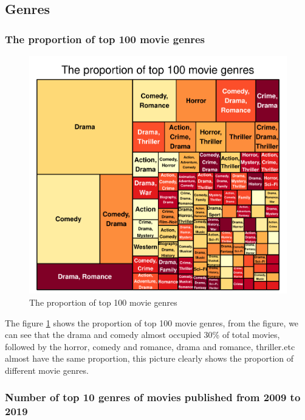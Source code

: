 \documentclass[11pt,a4paper,]{article}
\begin{document}
\hypertarget{genres}{%
\subsection{Genres}\label{genres}}

\hypertarget{the-proportion-of-top-100-movie-genres}{%
\subsubsection{The proportion of top 100 movie genres}\label{the-proportion-of-top-100-movie-genres}}

\begin{figure}
\centering
\includegraphics{Report_files/figure-latex/genres-1.pdf}
\caption{\label{fig:genres}The proportion of top 100 movie genres}
\end{figure}

The figure \ref{fig:genres} shows the proportion of top 100 movie genres, from the figure, we can see that the drama and comedy almost occupied 30\% of total movies, followed by the horror, comedy and romance, drama and romance, thriller.etc almost have the same proportion, this picture clearly shows the proportion of different movie genres.

\hypertarget{number-of-top-10-genres-of-movies-published-from-2009-to-2019}{%
\subsubsection{Number of top 10 genres of movies published from 2009 to 2019}\label{number-of-top-10-genres-of-movies-published-from-2009-to-2019}}
\end{document}
